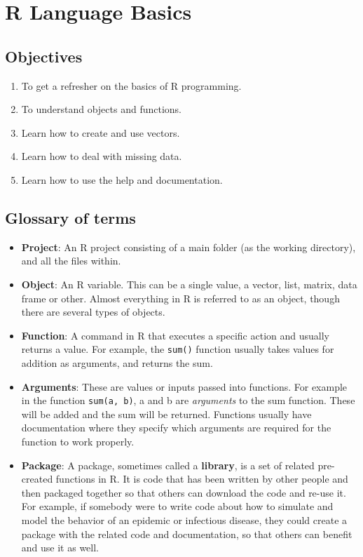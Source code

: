 \documentclass[]{book}
\providecommand{\tightlist}{%
  \setlength{\itemsep}{0pt}\setlength{\parskip}{0pt}}
\begin{document}
\hypertarget{r-language-basics}{%
\chapter{R Language Basics}\label{r-language-basics}}

\hypertarget{objectives}{%
\section{Objectives}\label{objectives}}

\begin{enumerate}
\def\labelenumi{\arabic{enumi}.}
\tightlist
\item
  To get a refresher on the basics of R programming.
\item
  To understand objects and functions.
\item
  Learn how to create and use vectors.
\item
  Learn how to deal with missing data.
\item
  Learn how to use the help and documentation.
\end{enumerate}

\hypertarget{glossary-of-terms}{%
\section{Glossary of terms}\label{glossary-of-terms}}

\begin{itemize}
\tightlist
\item
  \textbf{Project}: An R project consisting of a main folder (as the working directory), and all the files within.
\item
  \textbf{Object}: An R variable. This can be a single value, a vector, list, matrix, data frame or other. Almost everything in R is referred to as an object, though there are several types of objects.
\item
  \textbf{Function}: A command in R that executes a specific action and usually returns a value. For example, the \texttt{sum()} function usually takes values for addition as arguments, and returns the sum.
\item
  \textbf{Arguments}: These are values or inputs passed into functions. For example in the function \texttt{sum(a,\ b)}, a and b are \emph{arguments} to the sum function. These will be added and the sum will be returned. Functions usually have documentation where they specify which arguments are required for the function to work properly.
\item
  \textbf{Package}: A package, sometimes called a \textbf{library}, is a set of related pre-created functions in R. It is code that has been written by other people and then packaged together so that others can download the code and re-use it. For example, if somebody were to write code about how to simulate and model the behavior of an epidemic or infectious disease, they could create a package with the related code and documentation, so that others can benefit and use it as well.
\end{itemize}
\end{document}
